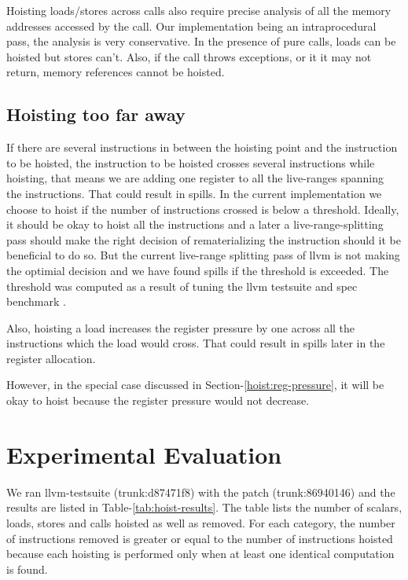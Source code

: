 \documentclass{sig-alternate}
\begin{document}
Hoisting loads/stores across calls also require precise analysis of all the
memory addresses accessed by the call. Our implementation being an
intraprocedural pass, the analysis is very conservative. In the presence of pure
calls, loads can be hoisted but stores can't. Also, if the call throws
exceptions, or it it may not return, memory references cannot be hoisted.

\subsection{Hoisting too far away}
If there are several instructions in between the hoisting point and the
instruction to be hoisted, the instruction to be hoisted crosses several
instructions while hoisting, that means we are adding one register to all the
live-ranges spanning the instructions. That could result in spills. In the
current implementation we choose to hoist if the number of instructions crossed
is below a threshold. Ideally, it should be okay to hoist all the instructions
and a later a live-range-splitting \cite{cooper1998live} pass should make the
right decision of rematerializing the instruction should it be beneficial to do
so. But the current live-range splitting pass of llvm is not making the optimial
decision and we have found spills if the threshold is exceeded. The threshold
was computed as a result of tuning the llvm testsuite \cite{llvm-nightly} and
spec benchmark \cite{Henning2000}.

Also, hoisting a load increases the register pressure by one across all the
instructions which the load would cross. That could result in spills later in
the register allocation.

However, in the special case discussed in Section-\ref{hoist:reg-pressure}, it
will be okay to hoist because the register pressure would not decrease.


\section{Experimental Evaluation}
\label{sec:experimental-results}
We ran llvm-testsuite (trunk:d87471f8) with the patch (trunk:86940146) and the
results are listed in Table-\ref{tab:hoist-results}. The table lists the number
of scalars, loads, stores and calls hoisted as well as removed. For each
category, the number of instructions removed is greater or equal to the number
of instructions hoisted because each hoisting is performed only when at least
one identical computation is found.
\end{document}
